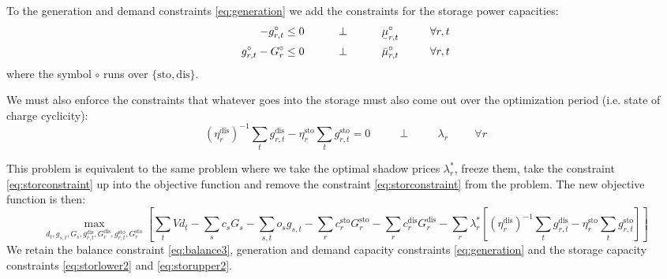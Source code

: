 \documentclass[final,3p]{elsarticle}
\begin{document}
To the generation and demand constraints \eqref{eq:generation} we add the
constraints for the storage power capacities:
\begin{align}
  -g^\circ_{r,t}\leq 0 \hspace{1cm}\perp \hspace{1cm} \ubar{\mu}^\circ_{r,t} \hspace{1cm} \forall r,t  \label{eq:storlower2} \\
  g^\circ_{r,t} - G^\circ_r \leq 0 \hspace{1cm}\perp \hspace{1cm} \bar{\mu}^\circ_{r,t} \hspace{1cm} \forall r,t \label{eq:storupper2}
\end{align}
where the symbol $\circ$ runs over $\{\textrm{sto},\textrm{dis}\}$.

We must also enforce the constraints that whatever goes into the storage must
also come out over the optimization period (i.e. state of charge cyclicity):
\begin{equation}
  (\eta_r^{\textrm{dis}})^{-1} \sum_t g^{\textrm{dis}}_{r,t} - \eta_r^{\textrm{sto}}  \sum_t g^{\textrm{sto}}_{r,t}  = 0  \hspace{1cm}\perp \hspace{1cm} \lambda_{r} \hspace{1cm} \forall r \label{eq:storconstraint}
\end{equation}

This problem is equivalent to the same problem where we take the optimal shadow
prices $\lambda^*_r$, freeze them, take the constraint \eqref{eq:storconstraint}
up into the objective function and remove the constraint
\eqref{eq:storconstraint} from the problem. The new objective function is then:
\begin{equation}
  \max_{d_{t}, g_{s,t}, G_s,g^{\textrm{dis}}_{r,t},G^{\textrm{dis}}_{r},g^{\textrm{sto}}_{r,t},G^{\textrm{sto}}_{r}}\left[\sum_{t} Vd_{t} -  \sum_s c_s G_s - \sum_{s,t} o_{s} g_{s,t} -\sum_r c^{\textrm{sto}}_r G^{\textrm{sto}}_r -\sum_r c^{\textrm{dis}}_r G^{\textrm{dis}}_r -\sum_r \lambda^*_r\left[ (\eta_r^{\textrm{dis}})^{-1} \sum_t g^{\textrm{dis}}_{r,t} - \eta_r^{\textrm{sto}}  \sum_t g^{\textrm{sto}}_{r,t}\right]  \right]  \label{eq:objst}
\end{equation}
We retain the balance constraint \eqref{eq:balance3}, generation and demand
capacity constraints \eqref{eq:generation} and the storage capacity constraints
\eqref{eq:storlower2} and \eqref{eq:storupper2}.
\end{document}
